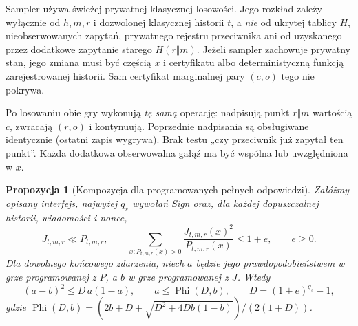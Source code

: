 \documentclass[11pt,a4paper]{article}
\newcommand{\PhiB}{\operatorname{Phi}}
\newtheorem{proposition}{Propozycja}
\begin{document}
Sampler używa świeżej prywatnej klasycznej losowości. Jego rozkład zależy
wyłącznie od $h,m,r$ i dozwolonej klasycznej historii $t$, a \emph{nie}
od ukrytej tablicy $H$, nieobserwowanych zapytań, prywatnego rejestru
przeciwnika ani od uzyskanego przez dodatkowe zapytanie starego $H(r\Vert m)$.
Jeżeli sampler zachowuje prywatny stan, jego zmiana musi być częścią $x$
i certyfikatu albo deterministyczną funkcją zarejestrowanej historii.
Sam certyfikat marginalnej pary $(c,o)$ tego nie pokrywa.

Po losowaniu obie gry wykonują \emph{tę samą} operację:
nadpisują punkt $r\Vert m$ wartością $c$, zwracają $(r,o)$ i kontynuują.
Poprzednie nadpisania są obsługiwane identycznie (ostatni zapis wygrywa).
Brak testu „czy przeciwnik już zapytał ten punkt”.
Każda dodatkowa obserwowalna gałąź ma być wspólna lub uwzględniona w $x$.

\begin{proposition}[Kompozycja dla programowanych pełnych odpowiedzi]
Załóżmy opisany interfejs, najwyżej $q_s$ wywołań Sign oraz, dla każdej
dopuszczalnej historii, wiadomości i nonce,
\[
 J_{t,m,r}\ll P_{t,m,r},\qquad
 \sum_{x:P_{t,m,r}(x)>0}\frac{J_{t,m,r}(x)^2}{P_{t,m,r}(x)}\le1+e,
 \qquad e\ge0.
\]
Dla dowolnego końcowego zdarzenia, niech $a$ będzie jego prawdopodobieństwem
w grze programowanej z $P$, a $b$ w grze programowanej z $J$. Wtedy
\[
 (a-b)^2\le D\,a(1-a),\qquad a\le\PhiB(D,b),\qquad
 D=(1+e)^{q_s}-1,
\]
gdzie $\PhiB(D,b)=(2b+D+\sqrt{D^2+4Db(1-b)})/(2(1+D))$.
\end{proposition}
\end{document}
